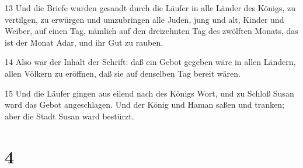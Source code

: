 \par 13 Und die Briefe wurden gesandt durch die Läufer in alle Länder des Königs, zu vertilgen, zu erwürgen und umzubringen alle Juden, jung und alt, Kinder und Weiber, auf einen Tag, nämlich auf den dreizehnten Tag des zwölften Monats, das ist der Monat Adar, und ihr Gut zu rauben.
\par 14 Also war der Inhalt der Schrift: daß ein Gebot gegeben wäre in allen Ländern, allen Völkern zu eröffnen, daß sie auf denselben Tag bereit wären.
\par 15 Und die Läufer gingen aus eilend nach des Königs Wort, und zu Schloß Susan ward das Gebot angeschlagen. Und der König und Haman saßen und tranken; aber die Stadt Susan ward bestürzt.

\chapter{4}

